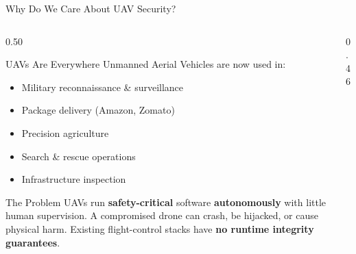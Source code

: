 \documentclass[aspectratio=169, 10pt]{beamer}
\begin{document}
\begin{frame}{Why Do We Care About UAV Security?}
    \begin{columns}[T]
        \begin{column}{0.50\textwidth}
            \begin{defbox}{UAVs Are Everywhere}
                \scriptsize Unmanned Aerial Vehicles are now used in:
                \begin{itemize}\scriptsize
                    \item[$>$] Military reconnaissance \& surveillance
                    \item[$>$] Package delivery (Amazon, Zomato)
                    \item[$>$] Precision agriculture
                    \item[$>$] Search \& rescue operations
                    \item[$>$] Infrastructure inspection
                \end{itemize}
            \end{defbox}
            \vspace{3pt}
            \begin{warnbox}{The Problem}
                \scriptsize UAVs run \textbf{safety-critical} software
                \textbf{autonomously} with little human supervision.
                A compromised drone can crash, be hijacked, or cause physical harm.
                Existing flight-control stacks have \textbf{no runtime integrity guarantees}.
            \end{warnbox}
        \end{column}
        \begin{column}{0.46\textwidth}
            \begin{center}
\end{center}
\end{column}
\end{columns}
\end{frame}
\end{document}

